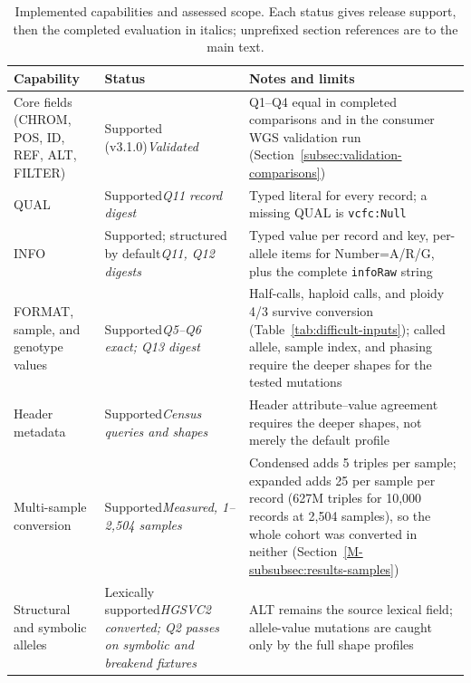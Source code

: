 \documentclass[11pt]{article}
\newcommand{\rowsep}{\noalign{\vskip2pt{\color{black!22}\hrule height 0.4pt}\vskip2pt}}%
\begin{document}
\begin{table}[!htbp]
\caption{Implemented capabilities and assessed scope. Each status gives release support, then the completed evaluation in italics; unprefixed section references are to the main text.}\label{tab:capabilities}%
\centering\footnotesize\setlength{\tabcolsep}{4pt}\renewcommand{\arraystretch}{1.1}\renewcommand{\tabularxcolumn}[1]{m{#1}}%
\begin{tabularx}{\textwidth}{@{}>{\raggedright\arraybackslash}m{}>{\raggedright\arraybackslash}m{}>{\raggedright\arraybackslash}X@{}}
\toprule
\textbf{Capability} & \textbf{Status} & \textbf{Notes and limits}\\
\midrule
Core fields (CHROM, POS, ID, REF, ALT, FILTER) & Supported (v3.1.0)\newline\textit{Validated} & Q1--Q4 equal in completed comparisons and in the consumer WGS validation run (Section~\ref{subsec:validation-comparisons})\\
\rowsep
QUAL & Supported\newline\textit{Q11 record digest} & Typed literal for every record; a missing QUAL is \texttt{vcfc:Null}\\
\rowsep
INFO & Supported; structured by default\newline\textit{Q11, Q12 digests} & Typed value per record and key, per-allele items for Number=A/R/G, plus the complete \texttt{infoRaw} string\\
\rowsep
FORMAT, sample, and genotype values & Supported\newline\textit{Q5--Q6 exact; Q13 digest} & Half-calls, haploid calls, and ploidy 4/3 survive conversion (Table~\ref{tab:difficult-inputs}); called allele, sample index, and phasing require the deeper shapes for the tested mutations\\
\rowsep
Header metadata & Supported\newline\textit{Census queries and shapes} & Header attribute--value agreement requires the deeper shapes, not merely the default profile\\
\rowsep
Multi-sample conversion & Supported\newline\textit{Measured, 1--2{,}504 samples} & Condensed adds 5 triples per sample; expanded adds 25 per sample per record (627M triples for 10{,}000 records at 2{,}504 samples), so the whole cohort was converted in neither (Section~\ref{M-subsubsec:results-samples})\\
\rowsep
Structural and symbolic alleles & Lexically supported\newline\textit{HGSVC2 converted; Q2 passes on symbolic and breakend fixtures} & ALT remains the source lexical field; allele-value mutations are caught only by the full shape profiles\\

\end{tabularx}
\end{table}
\end{document}
